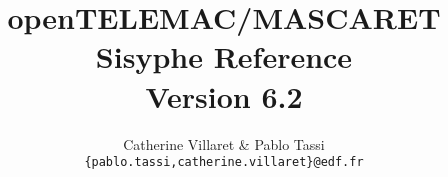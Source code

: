\title{\textbf{openTELEMAC/MASCARET \\
Sisyphe Reference \\
Version 6.2}}
\author{Catherine Villaret \& Pablo Tassi \\
   \texttt{\{pablo.tassi,catherine.villaret\}@edf.fr}}

\date{}
 
\maketitle
